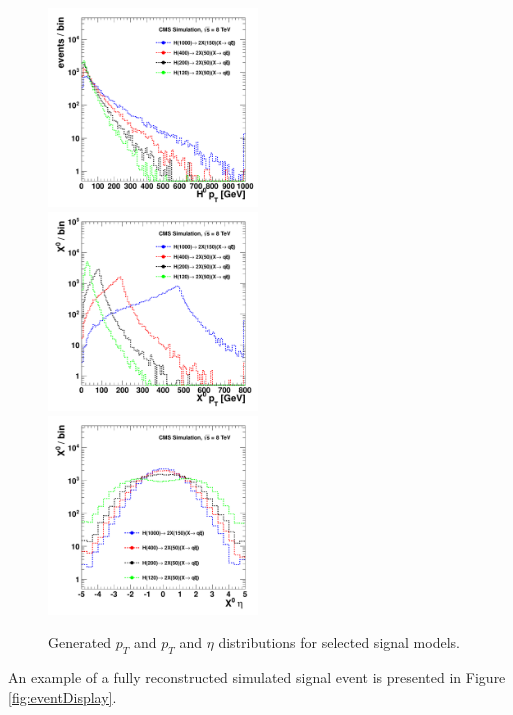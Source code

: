\begin{figure}[htbp]
\centering
\includegraphics[width=0.495\textwidth]{plots/signal/hpt.pdf}
\includegraphics[width=0.495\textwidth]{plots/signal/xpt.pdf}
\includegraphics[width=0.495\textwidth]{plots/signal/xeta.pdf}
\caption{Generated \Higgs $p_T$ and \X $p_T$ and $\eta$ distributions for selected signal models.\label{fig:sigHX}}
\end{figure}

An example of a fully reconstructed
simulated signal event is presented in Figure \ref{fig:eventDisplay}.

